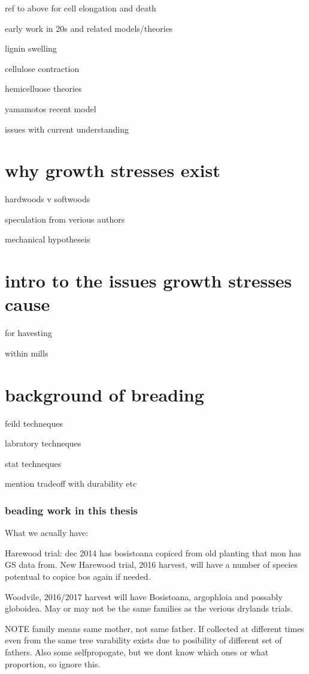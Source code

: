 \documentclass{article}
\begin{document}
ref to above for cell elongation and death

early work in 20s and related models/theories

lignin swelling

cellulose contraction

hemicelluose theories

yamamotos recent model

issues with current understanding



\section{why growth stresses exist}

hardwoods v softwoods

speculation from verious authors

mechanical hypotheseis

\section{intro to the issues growth stresses cause }

for havesting

within mills

\section{background of breading}

feild techneques

labratory techneques

stat techneques

mention tradeoff with durability etc

\subsubsection{beading work in this thesis}
What we acually have:

Harewood trial:
dec 2014 has bosistoana copiced from old planting that mon has GS data from.
New Harewood trial, 2016 harvest, will have a number of species potentual to copice bos again if needed.

Woodvile, 2016/2017 harvest will have Bosistoana, argophloia and possably globoidea. May or may not be the same families as the verious drylands trials.

NOTE family means same mother, not same father. If collected at different times even from the same tree varability exists due to posibility of different set of fathers. Also some selfpropogate, but we dont know which ones or what proportion, so ignore this.
\end{document}
